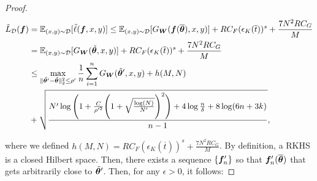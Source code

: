 \begin{proof}
    





\begin{align*}
    \Tilde{L}_{\mathcal{D}} ({\bm{f}}) &= \mathbb{E}_{(x, y) \sim {\mathcal{D}}}[\Tilde{\ell}({\bm{f}}, x, y)] \leq \mathbb{E}_{(x, y)\sim {\mathcal{D}}}[G_{\bm{W}}({\bm{f}}(\overline{{\bm{\theta}}}), x, y)] +  RC_F(\epsilon_K(\overline{t}))^s + \frac{7N^2R C_G}{M}\\
    & = \mathbb{E}_{(x, y)\sim {\mathcal{D}}}[G_{\bm{W}}(\Tilde{{\bm{\theta}}}, x, y)] +  RC_F(\epsilon_K(\overline{t}))^s + \frac{7N^2R C_G}{M}\\
    &\leq \max_{\|\Tilde{{\bm{\theta}}}' - \Tilde{{\bm{\theta}}}\|^2_2 \leq \rho'} \frac{1}{n}\sum_{i = 1}^n G_{\bm{W}}(\Tilde{{\bm{\theta}}}', x, y)  + h(M, N)\\
    &+ \sqrt{\frac{N' \log \Bigg(1 + \frac{C}{\rho'^2}\Bigg(1+ \sqrt{\frac{\log(N)}{N'}}\Bigg)^2 \Bigg)+4\log\frac{n}{\delta}+8\log(6n+3k)}{n-1}},
\end{align*}

where we defined $h(M, N) =  RC_F(\epsilon_K(\overline{t}))^s + \frac{7N^2R C_G}{M}$. By definition, a RKHS is a closed Hilbert space. Then, there exists a sequence $\{{\bm{f}}'_n\}$ so that ${\bm{f}}'_n(\overline{{\bm{\theta}}})$ that gets arbitrarily close to $\Tilde{{\bm{\theta}}}'$. Then, for any $\epsilon > 0$, it follows:


\end{proof}
